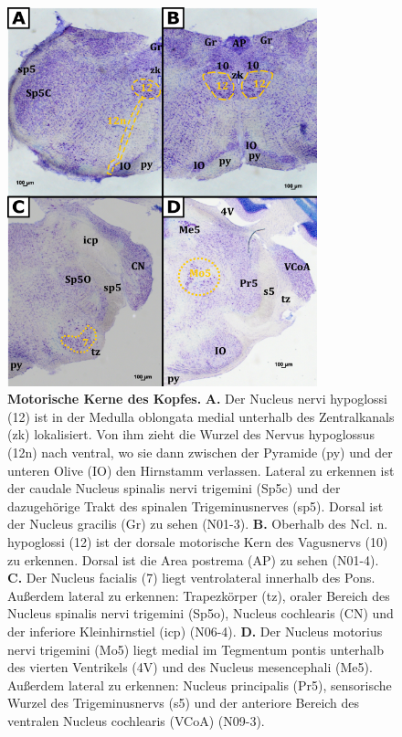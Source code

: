 \documentclass[12pt,a4paper,pdftex]{article}
\begin{document}
\begin{figure}[H]
    \centering
    \includegraphics[width=0.8\textwidth]{pictures/Bilder_Laura/Kerne_motorik_kopf_N01_3_N01_4_N06_4_N09_3.png}
    \caption[motorische Kerne des Kopfes]{\textbf{Motorische Kerne des Kopfes.} \textbf{A.} Der Nucleus nervi hypoglossi (12) ist in der Medulla oblongata medial unterhalb des Zentralkanals (zk) lokalisiert. Von ihm zieht die Wurzel des Nervus hypoglossus (12n) nach ventral, wo sie dann zwischen der Pyramide (py) und der unteren Olive (IO) den Hirnstamm verlassen. Lateral zu erkennen ist der caudale Nucleus spinalis nervi trigemini (Sp5c) und der dazugehörige Trakt des spinalen Trigeminusnerves (sp5). Dorsal ist der Nucleus gracilis (Gr) zu sehen (N01-3). \textbf{B.} Oberhalb des Ncl. n. hypoglossi (12) ist der dorsale motorische Kern des Vagusnervs (10) zu erkennen. Dorsal ist die Area postrema (AP) zu sehen (N01-4). \textbf{C.} Der Nucleus facialis (7) liegt ventrolateral innerhalb des Pons. Außerdem lateral zu erkennen: Trapezkörper (tz), oraler Bereich des Nucleus spinalis nervi trigemini (Sp5o), Nucleus cochlearis (CN) und der inferiore Kleinhirnstiel (icp) (N06-4). \textbf{D.} Der Nucleus motorius nervi trigemini (Mo5) liegt medial im Tegmentum pontis unterhalb des vierten Ventrikels (4V) und des Nucleus mesencephali (Me5). Außerdem lateral zu erkennen: Nucleus principalis (Pr5), sensorische Wurzel des Trigeminusnervs (s5) und der anteriore Bereich des ventralen Nucleus cochlearis (VCoA) (N09-3).}
    \label{fig:kerne_kopfmotorik}
\end{figure}
\end{document}
